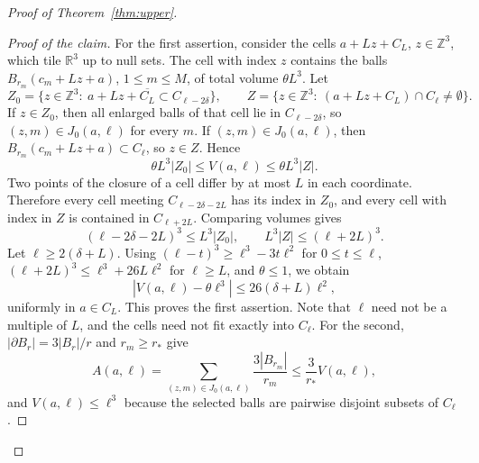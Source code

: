 \documentclass[final,reqno]{amsart}
\theoremstyle{remark}
\theoremstyle{definition}
\renewcommand{\le}{\leqslant}
\renewcommand{\ge}{\geqslant}
\newcommand{\RR}{\mathbb{R}}
\newcommand{\ZZ}{\mathbb{Z}}
\begin{document}
\begin{proof}[Proof of Theorem~\ref{thm:upper}]
\begin{proof}[Proof of the claim]
For the first assertion, consider the cells $a+Lz+C_L$, $z\in\ZZ^3$, which tile $\RR^3$ up to null sets. The cell with index $z$ contains the balls $B_{r_m}(c_m+Lz+a)$, $1\le m\le M$, of total volume $\theta L^3$. Let
\[
Z_0=\{z\in\ZZ^3:\ a+Lz+\overline{C_L}\subset C_{\ell-2\delta}\},
\qquad
Z=\{z\in\ZZ^3:\ (a+Lz+C_L)\cap C_\ell\ne\emptyset\}.
\]
If $z\in Z_0$, then all enlarged balls of that cell lie in $C_{\ell-2\delta}$, so $(z,m)\in J_0(a,\ell)$ for every $m$. If $(z,m)\in J_0(a,\ell)$, then $B_{r_m}(c_m+Lz+a)\subset C_\ell$, so $z\in Z$. Hence
\[
\theta L^3|Z_0|\le V(a,\ell)\le\theta L^3|Z|.
\]
Two points of the closure of a cell differ by at most $L$ in each coordinate. Therefore every cell meeting $C_{\ell-2\delta-2L}$ has its index in $Z_0$, and every cell with index in $Z$ is contained in $C_{\ell+2L}$. Comparing volumes gives
\[
(\ell-2\delta-2L)^3\le L^3|Z_0|,
\qquad
L^3|Z|\le(\ell+2L)^3.
\]
Let $\ell\ge2(\delta+L)$. Using $(\ell-t)^3\ge \ell^3-3t\ell^2$ for $0\le t\le \ell$, $(\ell+2L)^3\le \ell^3+26L\ell^2$ for $\ell\ge L$, and $\theta\le1$, we obtain
\[
|V(a,\ell)-\theta \ell^3|\le26(\delta+L)\ell^2,
\]
uniformly in $a\in C_L$. This proves the first assertion. Note that $\ell$ need not be a multiple of $L$, and the cells need not fit exactly into $C_\ell$. For the second, $|\partial B_r|=3|B_r|/r$ and $r_m\ge r_*$ give
\[
A(a,\ell)=\sum_{(z,m)\in J_0(a,\ell)}\frac{3|B_{r_m}|}{r_m}
\le\frac3{r_*}V(a,\ell),
\]
and $V(a,\ell)\le \ell^3$ because the selected balls are pairwise disjoint subsets of $C_\ell$.
\end{proof}


\end{proof}
\end{document}
